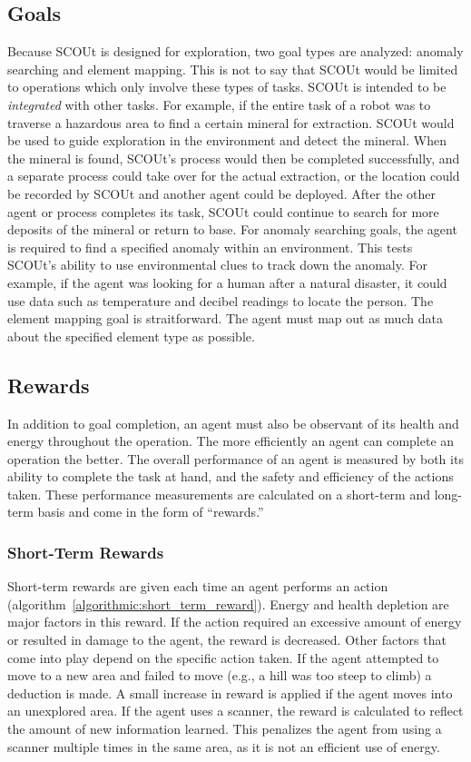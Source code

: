 \subsection{Goals} \label{subsec:goals}
Because SCOUt is designed for exploration, two goal types are analyzed: anomaly searching and element mapping.
This is not to say that SCOUt would be limited to operations which only involve these types of tasks.
SCOUt is intended to be \textit{integrated} with other tasks.
For example, if the entire task of a robot was to traverse a hazardous area to find a certain mineral for extraction.
SCOUt would be used to guide exploration in the environment and detect the mineral.
When the mineral is found, SCOUt's process would then be completed successfully, and a separate process could take over for the actual extraction, or the location could be recorded by SCOUt and another agent could be deployed.
After the other agent or process completes its task, SCOUt could continue to search for more deposits of the mineral or return to base.
For anomaly searching goals, the agent is required to find a specified anomaly within an environment.
This tests SCOUt's ability to use environmental clues to track down the anomaly.
For example, if the agent was looking for a human after a natural disaster, it could use data such as temperature and decibel readings to locate the person.
The element mapping goal is straitforward.
The agent must map out as much data about the specified element type as possible.


\subsection{Rewards} \label{subsec:rewards}
In addition to goal completion, an agent must also be observant of its health and energy throughout the operation.
The more efficiently an agent can complete an operation the better.
The overall performance of an agent is measured by both its ability to complete the task at hand, and the safety and efficiency of the actions taken.
These performance measurements are calculated on a short-term and long-term basis and come in the form of ``rewards.''

\subsubsection{Short-Term Rewards}
Short-term rewards are given each time an agent performs an action (algorithm~\ref{algorithmic:short_term_reward}).
Energy and health depletion are major factors in this reward.
If the action required an excessive amount of energy or resulted in damage to the agent, the reward is decreased.
Other factors that come into play depend on the specific action taken.
If the agent attempted to move to a new area and failed to move (e.g., a hill was too steep to climb) a deduction is made.
A small increase in reward is applied if the agent moves into an unexplored area.
If the agent uses a scanner, the reward is calculated to reflect the amount of new information learned.
This penalizes the agent from using a scanner multiple times in the same area, as it is not an efficient use of energy.

